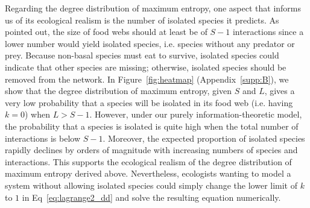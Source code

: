 
Regarding the degree distribution of maximum entropy, one aspect that informs us
of its ecological realism is the number of isolated species it predicts. As
\textcite{MacDonald2020Revisiting} pointed out, the size of food webs should at
least be of $S-1$ interactions since a lower number would yield isolated
species, i.e. species without any predator or prey. Because non-basal species
must eat to survive, isolated species could indicate that other species are
missing; otherwise, isolated species should be removed from the network. In
Figure~\ref{fig:heatmap} (Appendix~\ref{supp:B}), we show that the degree
distribution of maximum entropy, given $S$ and $L$, gives a very low probability
that a species will be isolated in its food web (i.e. having $k = 0$) when $L >
S-1$. However, under our purely information-theoretic model, the probability
that a species is isolated is quite high when the total number of interactions
is below $S-1$. Moreover, the expected proportion of isolated species rapidly
declines by orders of magnitude with increasing numbers of species and
interactions. This supports the ecological realism of the degree distribution of
maximum entropy derived above. Nevertheless, ecologists wanting to model a
system without allowing isolated species could simply change the lower limit of
$k$ to $1$ in Eq~\ref{eq:lagrange2_dd} and solve the resulting equation
numerically.

